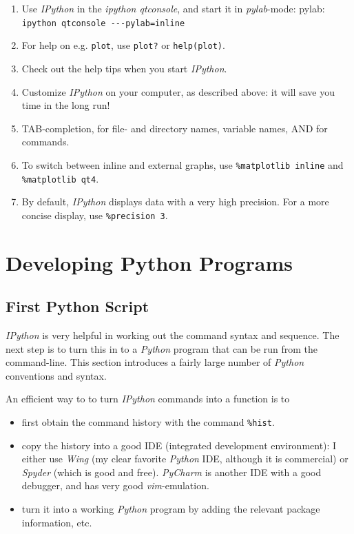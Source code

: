 \begin{enumerate}
    \item Use \emph{IPython} in the \emph{ipython qtconsole}, and start it in \emph{pylab}-mode: pylab: \lstinline{ipython qtconsole ---pylab=inline}
    \item For help on e.g. \lstinline{plot}, use \lstinline{plot?} or \lstinline{help(plot)}.
    \item Check out the help tips when you start \emph{IPython}.
    \item Customize \emph{IPython} on your computer, as described above: it will save you time in the long run!
    \item TAB-completion, for file- and directory names, variable names, AND for commands.
    \item To switch between inline and external graphs, use \; \lstinline{%matplotlib inline} \; and \; \lstinline{%matplotlib qt4}.
    \item By default, \emph{IPython} displays data with a very high precision. For a more concise display, use \lstinline{%precision 3}.
\end{enumerate}

\section{Developing Python Programs}

\subsection{First Python Script}

\emph{IPython} is very helpful in working out the command syntax and sequence. The next step is to turn this in to a \emph{Python} program that can be run from the command-line. This section introduces a fairly large number of \emph{Python} conventions and syntax.

An efficient way to to turn \emph{IPython} commands into a function is to

\begin{itemize}
  \item first obtain the command history with the command \lstinline{%hist}.
  \item copy the history into a good IDE (integrated development environment): I either use \emph{Wing} (my clear favorite \emph{Python} IDE, although it is commercial) or \emph{Spyder} (which is good and free). \emph{PyCharm} is another IDE with a good debugger, and has very good \emph{vim}-emulation.
  \item turn it into a working \emph{Python} program by adding the relevant package information, etc.
\end{itemize}

